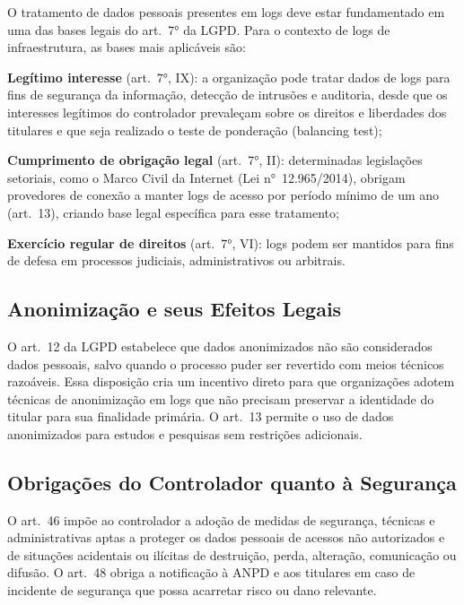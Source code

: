 O tratamento de dados pessoais presentes em logs deve estar fundamentado em uma das bases legais do art.\ 7° da LGPD. Para o contexto de logs de infraestrutura, as bases mais aplicáveis são:

\begin{alineas}
    \item \textbf{Legítimo interesse} (art.\ 7°, IX): a organização pode tratar dados de logs para fins de segurança da informação, detecção de intrusões e auditoria, desde que os interesses legítimos do controlador prevaleçam sobre os direitos e liberdades dos titulares e que seja realizado o teste de ponderação (balancing test);
    \item \textbf{Cumprimento de obrigação legal} (art.\ 7°, II): determinadas legislações setoriais, como o Marco Civil da Internet (Lei n°~12.965/2014), obrigam provedores de conexão a manter logs de acesso por período mínimo de um ano (art.\ 13), criando base legal específica para esse tratamento;
    \item \textbf{Exercício regular de direitos} (art.\ 7°, VI): logs podem ser mantidos para fins de defesa em processos judiciais, administrativos ou arbitrais.
\end{alineas}

\subsection{Anonimização e seus Efeitos Legais}
\label{subsec:anonimizacao-lgpd}

O art.\ 12 da LGPD estabelece que dados anonimizados não são considerados dados pessoais, salvo quando o processo puder ser revertido com meios técnicos razoáveis. Essa disposição cria um incentivo direto para que organizações adotem técnicas de anonimização em logs que não precisam preservar a identidade do titular para sua finalidade primária. O art.\ 13 permite o uso de dados anonimizados para estudos e pesquisas sem restrições adicionais.

\subsection{Obrigações do Controlador quanto à Segurança}
\label{subsec:obrigacoes-seguranca}

O art.\ 46 impõe ao controlador a adoção de medidas de segurança, técnicas e administrativas aptas a proteger os dados pessoais de acessos não autorizados e de situações acidentais ou ilícitas de destruição, perda, alteração, comunicação ou difusão. O art.\ 48 obriga a notificação à ANPD e aos titulares em caso de incidente de segurança que possa acarretar risco ou dano relevante.

